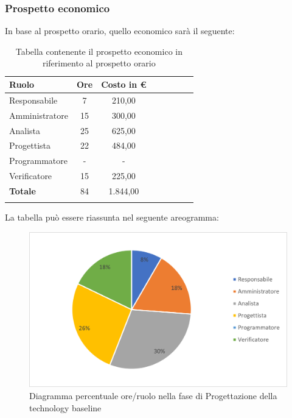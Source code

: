 \subsubsection{Prospetto economico}
In base al prospetto orario, quello economico sarà il seguente:

\begin{longtable}{|l|c|c|c|c|c|c|c|}
	\hline
	\rowcolor{lighter-grayer}
	\textbf{Ruolo}  & \textbf{Ore} & \textbf{Costo in €} \\
	\hline
	\endfirsthead

	\hline
	Responsabile    & 7            & 210,00              \\
	\hline
	\hline
	Amministratore  & 15           & 300,00              \\
	\hline
	\hline
	Analista        & 25           & 625,00              \\
	\hline
	\hline
	Progettista     & 22           & 484,00              \\
	\hline
	\hline
	Programmatore   & -            & -                   \\
	\hline
	\hline
	Verificatore    & 15           & 225,00              \\
	\hline
	\hline
	\textbf{Totale} & 84           & 1.844,00            \\
	\hline
	\rowcolor{white}
	\caption{Tabella contenente il prospetto economico in riferimento al prospetto orario}
\end{longtable}
\pagebreak

La tabella può essere riassunta nel seguente areogramma:
\begin{figure}[H]
	\centering
	\includegraphics[width=0.8\linewidth]{res/images/preventivo/3-2.png}
	\caption{Diagramma percentuale ore/ruolo nella fase di Progettazione della technology baseline }
	\label{fig:diagramma costi ruolo fase progettazione della technology baseline }
\end{figure}

